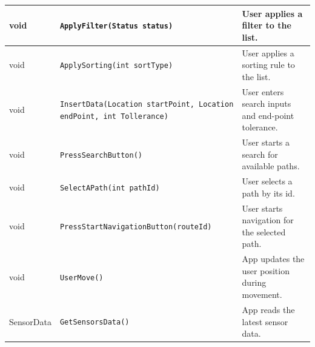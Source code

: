 \begin{table}[H]
\begin{tabularx}{\textwidth}{|L{3cm}|L{6.5cm}|Y|}
\hline
void & \texttt{ApplyFilter(Status status)} & User applies a filter to the list. \\
\hline
void & \texttt{ApplySorting(int sortType)} & User applies a sorting rule to the list. \\
\hline
void & \texttt{InsertData(Location startPoint, Location endPoint, int Tollerance)} & User enters search inputs and end-point tolerance. \\
\hline
void & \texttt{PressSearchButton()} & User starts a search for available paths. \\
\hline
void & \texttt{SelectAPath(int pathId)} & User selects a path by its id. \\
\hline
void & \texttt{PressStartNavigationButton(routeId)} & User starts navigation for the selected path. \\
\hline
void & \texttt{UserMove()} & App updates the user position during movement. \\
\hline
SensorData & \texttt{GetSensorsData()} & App reads the latest sensor data. \\
\hline
\end{tabularx}
\end{table}
\newpage
